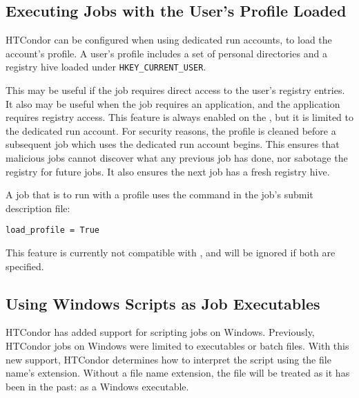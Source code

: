 \subsection{\label{sec:windows-load-profile}Executing Jobs with the User's Profile Loaded}
HTCondor can be configured when using dedicated run accounts, 
to load the account's profile.  A user's profile includes a set of personal 
directories and a registry hive loaded under \texttt{HKEY\_CURRENT\_USER}.

This may be useful if the job requires direct access to the user's registry 
entries.
It also may be useful when the job requires an application, 
and the application requires registry access. 
This feature is always enabled on the , 
but it is limited to the dedicated run account.
For security reasons, the profile is cleaned before a subsequent
job which uses the dedicated run account begins.
This ensures 
that malicious jobs cannot discover what any previous job has done, nor 
sabotage the registry for future jobs. It also ensures the next job has 
a fresh registry hive.

A job that is to run with a profile uses the
 command in the job's submit description file:
\begin{verbatim}
load_profile = True
\end{verbatim}

This feature is currently not compatible with , 
and will be ignored if both are specified.

\subsection{\label{sec:windows-scripts-as-executables}Using Windows Scripts as Job Executables}

HTCondor has added support for scripting jobs on Windows.
Previously, HTCondor jobs on Windows were limited to executables or batch files.
With this new support,
HTCondor determines how to interpret the script using 
the file name's extension.
Without a file name extension, 
the file will be treated as it has been in the past:
as a Windows executable.

